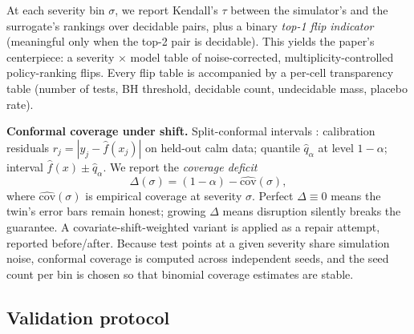 \documentclass[12pt,a4paper]{article}
\begin{document}
At each severity bin $\sigma$, we report Kendall's $\tau$ between the simulator's and the surrogate's rankings over decidable pairs, plus a binary \emph{top-1 flip indicator} (meaningful only when the top-2 pair is decidable). This yields the paper's centerpiece: a severity $\times$ model table of noise-corrected, multiplicity-controlled policy-ranking flips. Every flip table is accompanied by a per-cell transparency table (number of tests, BH threshold, decidable count, undecidable mass, placebo rate).

\textbf{Conformal coverage under shift.} Split-conformal intervals \citep{vovk2005,angelopoulos2023}: calibration residuals $r_j = |y_j - \hat f(x_j)|$ on held-out calm data; quantile $\hat q_{\alpha}$ at level $1-\alpha$; interval $\hat f(x) \pm \hat q_{\alpha}$. We report the \emph{coverage deficit}
\begin{equation}
\Delta(\sigma) = (1-\alpha) - \widehat{\mathrm{cov}}(\sigma),
\end{equation}
where $\widehat{\mathrm{cov}}(\sigma)$ is empirical coverage at severity $\sigma$. Perfect $\Delta \equiv 0$ means the twin's error bars remain honest; growing $\Delta$ means disruption silently breaks the guarantee. A covariate-shift-weighted variant \citep{tibshirani2019} is applied as a repair attempt, reported before/after. Because test points at a given severity share simulation noise, conformal coverage is computed across independent seeds, and the seed count per bin is chosen so that binomial coverage estimates are stable.

\subsection{Validation protocol}\label{sec:audit}
\end{document}
